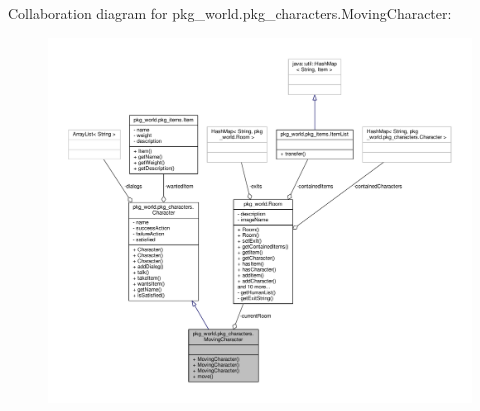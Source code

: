 Collaboration diagram for pkg\-\_\-world.\-pkg\-\_\-characters.\-Moving\-Character\-:
\nopagebreak
\begin{figure}[H]
\begin{center}
\leavevmode
\includegraphics[width=350pt]{classpkg__world_1_1pkg__characters_1_1MovingCharacter__coll__graph}
\end{center}
\end{figure}
